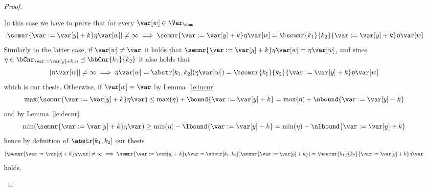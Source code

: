 \begin{proof}
\begin{inductive}
     In this case we have to prove that
    for every \(\var[w] \in \Var_{\com}\)
    \begin{equation*}
      |{\semnr{\var := \var[y] + k}\eta\var[w]}| \neq \infty
      \implies
      {\semnr{\var := \var[y] + k}\eta\var[w]} = {\bsemnr{k_1}{k_2}{\var := \var[y] + k}\eta\var[w]}
    \end{equation*}
    Similarly to the latter case, if \(\var[w] \neq \var\) it holds
    that \(\semnr{\var := \var[y] + k}\eta\var[w] = \eta\var[w]\), and
    since
    \(\eta \in \bCnr_{\var := \var[y] + k, \eta} \preceq
    \bbCnr{k_1}{k_2}\) it also holds that
    \begin{equation*}
      |\eta\var[w]| \neq \infty \implies \eta\var[w] = \abstr[k_1,k_2](\eta\var[w]) = \bsemnr{k_1}{k_2}{\var := \var[y] + k}\eta\var[w]
    \end{equation*}
    which is our thesis. Otherwise, if \(\var[w] = \var\) by
    Lemma~\ref{le:incnr}
    \begin{equation*}
      \max(\semnr{\var := \var[y] + k}\eta\var) \leq \max(\eta) +
      \bound{\var := \var[y] + k} = \max(\eta) + \nbound{\var := \var[y]
        + k}
    \end{equation*}
    and by Lemma~\ref{le:decnr} 
    \begin{equation*}
      \min(\semnr{\var := \var[y] + k}\eta\var) \geq \min(\eta) -
      \lbound{\var := \var[y] + k} = \min(\eta) - \nlbound{\var := \var[y]
        + k}
    \end{equation*}
    hence by definition of \(\abstr[k_1,k_2]\) our thesis
    \begin{equation*}
      |\semnr{\var := \var[y] + k}\eta\var| \neq \infty \implies
      \semnr{\var := \var[y] + k}\eta\var =
      \abstr[k_1,k_2](\semnr{\var := \var[y] + k}) =
      \bsemnr{k_1}{k_2}{\var := \var[y] + k}\eta\var
    \end{equation*}
    holds.


\end{inductive}
\end{proof}
